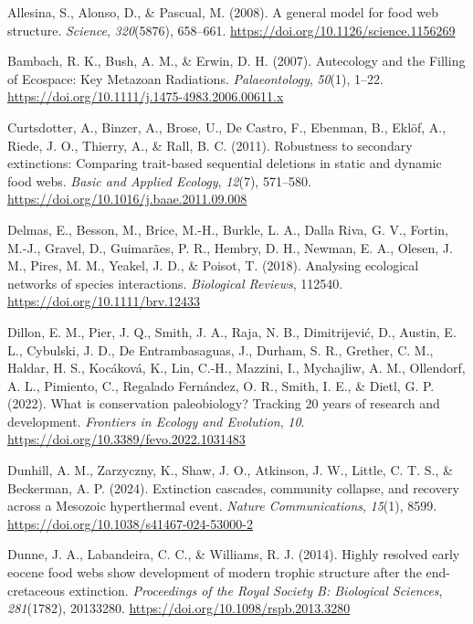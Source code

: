 \documentclass[
]{article}
\newlength{\cslhangindent}
\newenvironment{CSLReferences}[2] %
 {\begin{list}{}{%
  \setlength{\itemindent}{0pt}
  \setlength{\leftmargin}{0pt}
  \setlength{\parsep}{0pt}
  \ifodd #1
   \setlength{\leftmargin}{\cslhangindent}
   \setlength{\itemindent}{-1\cslhangindent}
  \fi
  \setlength{\itemsep}{#2\baselineskip}}}
 {\end{list}}
\begin{document}
\label{refs}
\begin{CSLReferences}{1}{0}
Allesina, S., Alonso, D., \& Pascual, M. (2008). A general model for
food web structure. \emph{Science}, \emph{320}(5876), 658--661.
\url{https://doi.org/10.1126/science.1156269}

Bambach, R. K., Bush, A. M., \& Erwin, D. H. (2007). Autecology and the
Filling of Ecospace: Key Metazoan Radiations. \emph{Palaeontology},
\emph{50}(1), 1--22.
\url{https://doi.org/10.1111/j.1475-4983.2006.00611.x}

Curtsdotter, A., Binzer, A., Brose, U., De Castro, F., Ebenman, B.,
Eklöf, A., Riede, J. O., Thierry, A., \& Rall, B. C. (2011). Robustness
to secondary extinctions: Comparing trait-based sequential deletions in
static and dynamic food webs. \emph{Basic and Applied Ecology},
\emph{12}(7), 571--580. \url{https://doi.org/10.1016/j.baae.2011.09.008}

Delmas, E., Besson, M., Brice, M.-H., Burkle, L. A., Dalla Riva, G. V.,
Fortin, M.-J., Gravel, D., Guimarães, P. R., Hembry, D. H., Newman, E.
A., Olesen, J. M., Pires, M. M., Yeakel, J. D., \& Poisot, T. (2018).
Analysing ecological networks of species interactions. \emph{Biological
Reviews}, 112540. \url{https://doi.org/10.1111/brv.12433}

Dillon, E. M., Pier, J. Q., Smith, J. A., Raja, N. B., Dimitrijević, D.,
Austin, E. L., Cybulski, J. D., De Entrambasaguas, J., Durham, S. R.,
Grether, C. M., Haldar, H. S., Kocáková, K., Lin, C.-H., Mazzini, I.,
Mychajliw, A. M., Ollendorf, A. L., Pimiento, C., Regalado Fernández, O.
R., Smith, I. E., \& Dietl, G. P. (2022). What is conservation
paleobiology? Tracking 20 years of research and development.
\emph{Frontiers in Ecology and Evolution}, \emph{10}.
\url{https://doi.org/10.3389/fevo.2022.1031483}

Dunhill, A. M., Zarzyczny, K., Shaw, J. O., Atkinson, J. W., Little, C.
T. S., \& Beckerman, A. P. (2024). Extinction cascades, community
collapse, and recovery across a Mesozoic hyperthermal event.
\emph{Nature Communications}, \emph{15}(1), 8599.
\url{https://doi.org/10.1038/s41467-024-53000-2}

Dunne, J. A., Labandeira, C. C., \& Williams, R. J. (2014). Highly
resolved early eocene food webs show development of modern trophic
structure after the end-cretaceous extinction. \emph{Proceedings of the
Royal Society B: Biological Sciences}, \emph{281}(1782), 20133280.
\url{https://doi.org/10.1098/rspb.2013.3280}


\end{CSLReferences}
\end{document}
